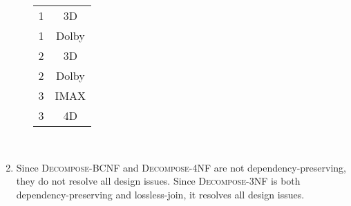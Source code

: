 \documentclass[12pt]{article}
\begin{document}
\begin{enumerate}
\begin{itemize}
\begin{center}
\begin{tabular}{c c}
                    \hline
                    1 & 3D \\
                    1 & Dolby \\
                    2 & 3D \\
                    2 & Dolby \\
                    3 & IMAX \\
                    3 & 4D  \\
                    \hline
                  \end{tabular}
                \end{center}
        \end{itemize}
  \ \\

  \item Since \textsc{Decompose-BCNF} and \textsc{Decompose-4NF} are not
        dependency-preserving, they do not resolve all design issues. Since
        \textsc{Decompose-3NF} is both dependency-preserving and lossless-join,
        it resolves all design issues.

\end{enumerate}
\end{document}

